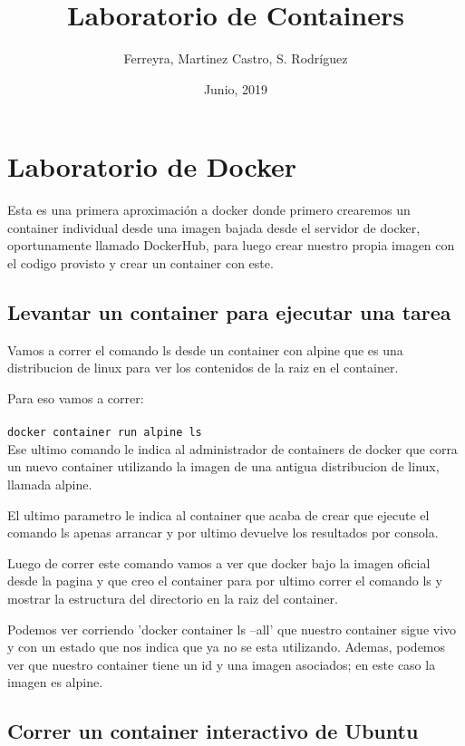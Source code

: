 \documentclass[11pt]{article} %
\title{Laboratorio de Containers}
\author{Ferreyra, Martinez Castro, S. Rodríguez}
\date{Junio, 2019} %
\begin{document}
\maketitle

\section{Laboratorio de Docker}

Esta es una primera aproximación a docker donde primero crearemos un container individual desde una imagen bajada desde el servidor de docker, oportunamente llamado DockerHub, para luego crear nuestro propia imagen con el codigo provisto y crear un container con este.

\subsection{Levantar un container para ejecutar una tarea}

Vamos a correr el comando ls desde un container con alpine que es una distribucion de linux para ver los contenidos de la raiz en el container.

Para eso vamos a correr:  \\ \\
	\texttt{docker container run alpine ls} 
	\\


Ese ultimo comando le indica al administrador de containers de docker que corra un nuevo container utilizando la imagen de una antigua distribucion de linux, llamada alpine.

El ultimo parametro le indica al container que acaba de crear que ejecute el comando ls apenas arrancar y por ultimo devuelve los resultados por consola.


Luego de correr este comando vamos a ver que docker bajo la imagen oficial desde la pagina y que creo el container para por ultimo correr el comando ls y mostrar la estructura del directorio en la raiz del container.

Podemos ver corriendo 'docker container ls --all' que nuestro container sigue vivo y con un estado que nos indica que ya no se esta utilizando. Ademas, podemos ver que nuestro  container tiene un id y una imagen asociados; en este caso la imagen es alpine.

\subsection{Correr un container interactivo de Ubuntu}
\end{document}
